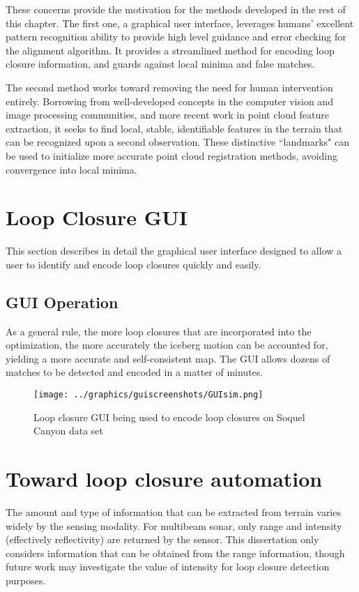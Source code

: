 These concerns provide the motivation for the methods developed in the rest of this chapter. The first one, a graphical user interface, leverages humans' excellent pattern recognition ability to provide high level guidance and error checking for the alignment algorithm. It provides a streamlined method for encoding loop closure information, and guards against local minima and false matches. 

The second method works toward removing the need for human intervention entirely. Borrowing from well-developed concepts in the computer vision and image processing communities, and more recent work in point cloud feature extraction, it seeks to find local, stable, identifiable features in the terrain that can be recognized upon a second observation. These distinctive ``landmarks" can be used to initialize more accurate point cloud registration methods, avoiding convergence into local minima. 


\section{Loop Closure GUI}
\label{sec:GUI}

This section describes in detail the graphical user interface designed to allow a user to identify and encode loop closures quickly and easily. 

\subsection{GUI Operation}

As a general rule, the more loop closures that are incorporated into the optimization, the more accurately the iceberg motion can be accounted for, yielding a more accurate and self-consistent map. The GUI allows dozens of matches to be detected and encoded in a matter of minutes. 

 \begin{figure}[htb]
   \centering
   \texttt{[image: ../graphics/guiscreenshots/GUIsim.png]} %
   \caption{Loop closure GUI being used to encode loop closures on Soquel Canyon data set }
   \label{fig:GUI}
\end{figure}


\section{Toward loop closure automation}

The amount and type of information that can be extracted from terrain varies widely by the sensing modality. For multibeam sonar, only range and intensity (effectively reflectivity) are returned by the sensor. This dissertation only considers information that can be obtained from the range information, though future work may investigate the value of intensity for loop closure detection purposes.

